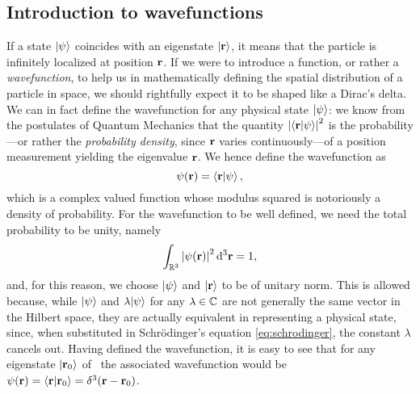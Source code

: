         \subsection{Introduction to wavefunctions}
            If a state $\ket{\psi}$ coincides with an eigenstate $\ket{\vb{r}}$, it means that the particle is infinitely localized at position $\vb{r}$. If we were to introduce a function, or rather a \emph{wavefunction}, to help us in mathematically defining the spatial distribution of a particle in space, we should rightfully expect it to be shaped like a Dirac's delta. We can in fact define the wavefunction for any physical state $\ket{\psi}$: we know from the postulates of Quantum Mechanics that the quantity $\abs{\braket{\vb{r}}{\psi}}^2$ is the probability---or rather the \emph{probability density}, since $\vb{r}$ varies continuously---of a position measurement yielding the eigenvalue $\vb{r}$. We hence define the wavefunction as
            \begin{equation}
                \label{eq:vavefunction}
                \psi\pqty{\vb{r}} = \braket{\vb{r}}{\psi}
                \mycomma
            \end{equation}
            which is a complex valued function whose modulus squared is notoriously a density of probability. For the wavefunction to be well defined, we need the total probability to be unity, namely 
            \begin{equation}
                \label{eq:normalization}
                \int\nolimits_{\bbR^3}\abs{\psi\pqty{\vb{r}}}^2 \dd[3]{\vb{r}} = 1
                \mycomma
            \end{equation}
            and, for this reason, we choose $\ket{\psi}$ and $\ket{\vb{r}}$ to be of unitary norm. This is allowed because, while $\ket{\psi}$ and $\lambda\!\ket{\psi}$ for any $\lambda\in\mathbb{C}$ are not generally the same vector in the Hilbert space, they are actually equivalent in representing a physical state, since, when substituted in Schr\"odinger's equation \eqref{eq:schrodinger}, the constant $\lambda$ cancels out. %
            Having defined the wavefunction, it is easy to see that for any eigenstate $\ket{\vb{r}_0}$ of \hvr\ the associated wavefunction would be $\psi\pqty{\vb{r}} = \braket{\vb{r}}{\vb{r}_0} = \delta^3\pqty{\vb{r} - \vb{r}_0}$.

